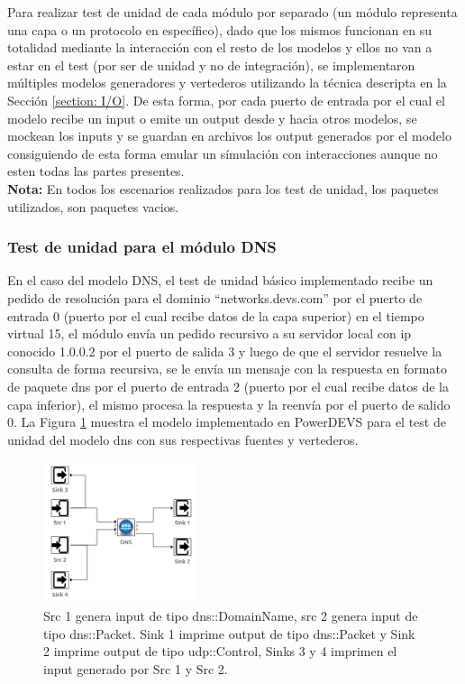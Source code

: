 \documentclass[10pt,a4paper]{article}
\begin{document}
Para realizar test de unidad de cada módulo por separado (un módulo representa una capa o un protocolo en específico), dado que los mismos funcionan en su totalidad mediante la interacción con el resto de los modelos y ellos no van a estar en el test (por ser de unidad y no de integración), se implementaron múltiples modelos generadores y vertederos utilizando la técnica descripta en la Sección \ref{section: I/O}. De esta forma, por cada puerto de entrada por el cual el modelo recibe un input o emite un output desde y hacia otros modelos, se mockean los inputs y se guardan en archivos los output generados por el modelo consiguiendo de esta forma emular un símulación con interacciones aunque no esten todas las partes presentes. \\

\textbf{Nota:} En todos los escenarios realizados para los test de unidad, los paquetes utilizados, son paquetes vacios.\\

\subsubsection{Test de unidad para el módulo DNS}

En el caso del modelo DNS, el test de unidad básico implementado recibe un pedido de resolución para el dominio ``networks.devs.com'' por el puerto de entrada 0 (puerto por el cual recibe datos de la capa superior) en el tiempo virtual 15, el módulo envía un pedido recursivo a su servidor local con ip conocido 1.0.0.2 por el puerto de salida 3 y luego de que el servidor resuelve la consulta de forma recursiva, se le envía un mensaje con la respuesta en formato de paquete dns por el puerto de entrada 2 (puerto por el cual recibe datos de la capa inferior), el mismo procesa la respuesta y la reenvía por el puerto de salido 0. La Figura \ref{figure: unit test dns} muestra el modelo implementado en PowerDEVS para el test de unidad del modelo dns con sus respectivas fuentes y vertederos.

\begin{figure}[!h]
    \centering
    \includegraphics[width = 0.4\textwidth]{img/png/unit_tests/dns.png}
    \caption{Src 1 genera input de tipo dns::DomainName, src 2 genera input de tipo dns::Packet. Sink 1 imprime output de tipo dns::Packet y Sink 2 imprime output de tipo udp::Control, Sinks 3 y 4 imprimen el input generado por Src 1 y Src 2.}
    \label{figure: unit test dns}
\end{figure}
\end{document}
